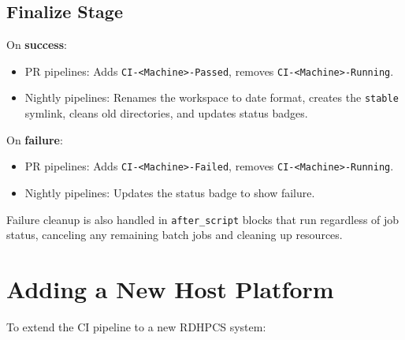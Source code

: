 \documentclass[11pt,letterpaper,twoside]{article}
\begin{document}
\subsection{Finalize Stage}
\label{sec:finalize}

On \textbf{success}:
\begin{itemize}[leftmargin=1.5em]
  \item PR pipelines: Adds \texttt{CI-<Machine>-Passed}, removes
    \texttt{CI-<Machine>-Running}.
  \item Nightly pipelines: Renames the workspace to date format, creates the
    \texttt{stable} symlink, cleans old directories, and updates status badges.
\end{itemize}

On \textbf{failure}:
\begin{itemize}[leftmargin=1.5em]
  \item PR pipelines: Adds \texttt{CI-<Machine>-Failed}, removes
    \texttt{CI-<Machine>-Running}.
  \item Nightly pipelines: Updates the status badge to show failure.
\end{itemize}

Failure cleanup is also handled in \texttt{after\_script} blocks that run
regardless of job status, canceling any remaining batch jobs and cleaning up
resources.


\section{Adding a New Host Platform}
\label{sec:new-host}

To extend the CI pipeline to a new RDHPCS system:
\end{document}
